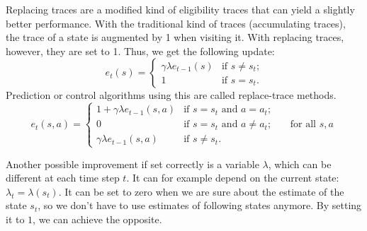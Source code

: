 \documentclass[a4paper, 11pt]{article}
\begin{document}
Replacing traces are a modified kind of eligibility traces that can yield a slightly better performance. With the traditional kind of traces (accumulating traces), the trace of a state is augmented by 1 when visiting it. With replacing traces, however, they are set to 1. Thus, we get the following update:
\begin{equation}
e_t(s) = \begin{cases}
\gamma \lambda e_{t-1}(s) & \text{if $s \neq s_t$;}\\
1 & \text{if $s=s_t$.}
\end{cases}
\end{equation}
Prediction or control algorithms using this are called replace-trace methods.
\begin{equation}
e_t(s,a) = \begin{cases}
1 + \gamma \lambda e_{t-1}(s,a) & \text{if $s=s_t$ and $a=a_t$;}\\
0 & \text{if $s=s_t$ and $a \neq a_t$;} \qquad \text{for all $s,a$}\\
\gamma \lambda e_{t-1}(s,a) & \text{if $s \neq s_t$.}
\end{cases}
\end{equation}

Another possible improvement if set correctly is a variable $\lambda$, which can be different at each time step $t$. It can for example depend on the current state: $\lambda_t = \lambda(s_t)$. It can be set to zero when we are sure about the estimate of the state $s_t$, so we don't have to use estimates of following states anymore. By setting it to $1$, we can achieve the opposite.

\end{document}
